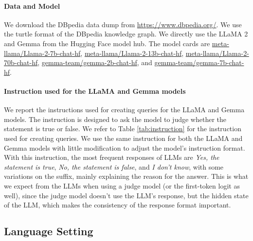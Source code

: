 \paragraph{Data and Model}
 We download the DBpedia data dump from \href{https://www.dbpedia.org/}{https://www.dbpedia.org/}. We use the turtle format of the DBpedia knowledge graph. 
 We directly use the LLaMA 2 and Gemma from the Hugging Face model hub. The model cards are
 \href{https://huggingface.co/meta-llama/Llama-2-7b-chat-hf}{meta-llama/Llama-2-7b-chat-hf}, \href{https://huggingface.com/meta-llama/Llama-2-13b-chat-hf}{ meta-llama/Llama-2-13b-chat-hf}, \href{https://huggingface.co/meta-llama/Llama-2-70b-chat-hf}{meta-llama/Llama-2-70b-chat-hf}, \href{https://huggingface.co/gemma-team/gemma-2b-chat-hf}{gemma-team/gemma-2b-chat-hf}, and \href{https://huggingface.co/gemma-team/gemma-7b-chat-hf}{gemma-team/gemma-7b-chat-hf}. 
 



\paragraph{Instruction used for the LLaMA and Gemma models}
We report the instructions used for creating queries for the LLaMA and Gemma models. The instruction is designed to ask the model to judge whether the statement is true or false. We refer to Table \ref{tab:instruction} for the instruction used for creating queries. We use the same instruction for both the LLaMA and Gemma models with little modification to adjust the model's instruction format. With this instruction, the most frequent responses of LLMs are \textit{Yes, the statement is true}, \textit{No, the statement is false}, and \textit{I don't know}, with some variations on the suffix, mainly explaining the reason for the answer. This is what we expect from the LLMs when using a judge model (or the first-token logit as well), since the judge model doesn't use the LLM's response, but the hidden state of the LLM, which makes the consistency of the response format important. 


\subsection{Language Setting}


